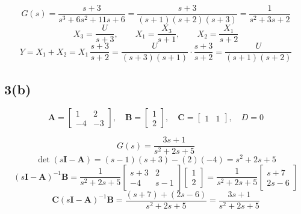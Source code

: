 \documentclass[11pt]{article}
\newcommand{\codepair}[2]{%
  \par\noindent\begin{minipage}{\linewidth}
  
  
  \end{minipage}\par}
\begin{document}
\codepair{matlab/p3a.m}{outputs/p3a.txt}

\[
G(s) = \frac{s+3}{s^3 + 6s^2 + 11s + 6} = \frac{s+3}{(s+1)(s+2)(s+3)} = \frac{1}{s^2 + 3s + 2}
\]
\[
X_3 = \frac{U}{s+3},\qquad X_1 = \frac{X_3}{s+1},\qquad X_2 = \frac{X_1}{s+2}
\]
\[
Y = X_1 + X_2 = X_1\,\frac{s+3}{s+2} = \frac{U}{(s+3)(s+1)}\cdot\frac{s+3}{s+2} = \frac{U}{(s+1)(s+2)}
\]

\subsection*{3(b)}

\[
\mathbf{A} = \begin{bmatrix}1 & 2\\ -4 & -3\end{bmatrix},\quad
\mathbf{B} = \begin{bmatrix}1\\ 2\end{bmatrix},\quad
\mathbf{C} = \begin{bmatrix}1 & 1\end{bmatrix},\quad
D = 0
\]

\codepair{matlab/p3b.m}{outputs/p3b.txt}

\[
G(s) = \frac{3s + 1}{s^2 + 2s + 5}
\]
\[
\det(s\mathbf{I}-\mathbf{A}) = (s-1)(s+3) - (2)(-4) = s^2 + 2s + 5
\]
\[
(s\mathbf{I}-\mathbf{A})^{-1}\mathbf{B} = \frac{1}{s^2+2s+5}
\begin{bmatrix}s+3 & 2\\ -4 & s-1\end{bmatrix}
\begin{bmatrix}1\\ 2\end{bmatrix}
= \frac{1}{s^2+2s+5}\begin{bmatrix}s+7\\ 2s-6\end{bmatrix}
\]
\[
\mathbf{C}(s\mathbf{I}-\mathbf{A})^{-1}\mathbf{B} = \frac{(s+7) + (2s-6)}{s^2+2s+5} = \frac{3s+1}{s^2+2s+5}
\]
\end{document}

